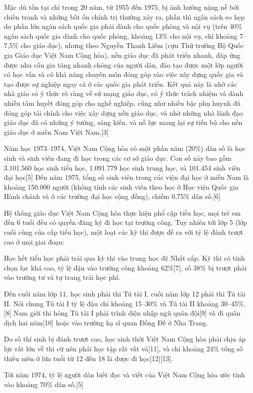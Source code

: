 \documentclass[../thesis.tex]{subfiles}
\begin{document}
Mặc dù tồn tại chỉ trong 20 năm, từ 1955 đến 1975, bị ảnh hưởng nặng nề bởi chiến tranh và những bất ổn chính trị thường xảy ra, phần thì ngân sách eo hẹp do phần lớn ngân sách quốc gia phải dành cho quốc phòng và nội vụ (trên 40\% ngân sách quốc gia dành cho quốc phòng, khoảng 13\% cho nội vụ, chỉ khoảng 7–7,5\% cho giáo dục), nhưng theo Nguyễn Thanh Liêm (cựu Thứ trưởng Bộ Quốc gia Giáo dục Việt Nam Cộng hòa), nền giáo dục đã phát triển nhanh, đáp ứng được nhu cầu gia tăng nhanh chóng của người dân, đào tạo được một lớp người có học vấn và có khả năng chuyên môn đóng góp vào việc xây dựng quốc gia và tạo được sự nghiệp ngay cả ở các quốc gia phát triển. Kết quả này là nhờ các nhà giáo có ý thức rõ ràng về sứ mạng giáo dục, có ý thức trách nhiệm và dành nhiều tâm huyết đóng góp cho nghề nghiệp, cũng như nhiều bậc phụ huynh đã đóng góp tài chính cho việc xây dựng nền giáo dục, và nhờ những nhà lãnh đạo giáo dục đã có những ý tưởng, sáng kiến, và nỗ lực mang lại sự tiến bộ cho nền giáo dục ở miền Nam Việt Nam.[3]

Năm học 1973–1974, Việt Nam Cộng hòa có một phần năm (20\%) dân số là học sinh và sinh viên đang đi học trong các cơ sở giáo dục. Con số này bao gồm 3.101.560 học sinh tiểu học, 1.091.779 học sinh trung học, và 101.454 sinh viên đại học[5] Đến năm 1975, tổng số sinh viên trong các viện đại học ở miền Nam là khoảng 150.000 người (không tính các sinh viên theo học ở Học viện Quốc gia Hành chánh và ở các trường đại học cộng đồng), chiếm 0,75\% dân số.[6]

Hệ thống giáo dục Việt Nam Cộng hòa thực hiện phổ cập tiểu học, mọi trẻ em đến 6 tuổi đều có quyền đăng ký đi học tại trường công. Tuy nhiên tới lớp 5 (lớp cuối cùng của cấp tiểu học), một loạt các kỳ thi được đề ra với tỷ lệ đánh trượt cao ở mọi giai đoạn:

Học hết tiểu học phải trải qua kỳ thi vào trung học đệ Nhất cấp. Kỳ thi có tính chọn lọc khá cao, tỷ lệ đậu vào trường công khoảng 62\%[7], số 38\% bị trượt phải vào trường tư và tự trang trải học phí.

Đến cuối năm lớp 11, học sinh phải thi Tú tài I, cuối năm lớp 12 phải thi Tú tài II. Nói chung Tú tài I tỷ lệ đậu chỉ khoảng 15–30\% và Tú tài II khoảng 30–45\%.[8] Nam giới thi hỏng Tú tài I phải trình diện nhập ngũ quân đội[9] và đi quân dịch hai năm[10] hoặc vào trường hạ sĩ quan Đồng Đế ở Nha Trang.

Do số thí sinh bị đánh trượt cao, học sinh thời Việt Nam Cộng hòa phải chịu áp lực rất lớn về thi cử nên phải học tập rất vất vả[11], và chỉ khoảng 24\% tổng số thiếu niên ở lứa tuổi từ 12 đến 18 là được đi học[12][13].

Tới năm 1974, tỷ lệ người dân biết đọc và viết của Việt Nam Cộng hòa ước tính vào khoảng 70\% dân số.[5]
\end{document}
